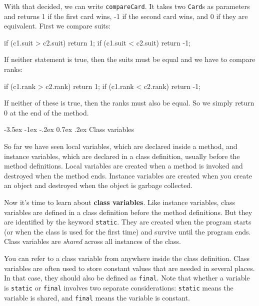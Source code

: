 \documentclass[12pt]{book}
\makeatletter
\theoremstyle{exercise}
\newcommand{\java}[1]{\verb"#1"}
\renewcommand{\section}{\@startsection{section}{1}{\z@}%
    {-3.5ex \@plus -1ex \@minus -.2ex}%
    {0.7ex \@plus.2ex}%
    {\normalfont\Large\bfseries}}
\newcommand{\java}[1]{\lstinline{#1}} %
\makeatother
\begin{document}
With that decided, we can write \java{compareCard}.
It takes two \java{Card}s as parameters and returns 1 if the first card wins, -1 if the second card wins, and 0 if they are equivalent.
First we compare suits:

\begin{code}
    if (c1.suit > c2.suit) {
        return 1;
    }
    if (c1.suit < c2.suit) {
        return -1;
    }
\end{code}

If neither statement is true, then the suits must be equal and we have to compare ranks:

\begin{code}
    if (c1.rank > c2.rank) {
        return 1;
    }
    if (c1.rank < c2.rank) {
        return -1;
    }
\end{code}

If neither of these is true, then the ranks must also be equal.
So we simply return 0 at the end of the method.


\section{Class variables}
\label{classvar}

So far we have seen local variables, which are declared inside a method, and instance variables, which are declared in a class definition, usually before the method definitions.
Local variables are created when a method is invoked and destroyed when the method ends.
Instance variables are created when you create an object and destroyed when the object is garbage collected.


Now it's time to learn about {\bf class variables}.
Like instance variables, class variables are defined in a class definition before the method definitions.
But they are identified by the keyword \java{static}.
They are created when the program starts (or when the class is used for the first time) and survive until the program ends.
Class variables are {\em shared} across all instances of the class.

You can refer to a class variable from anywhere inside the class definition.
Class variables are often used to store constant values that are needed in several places.
In that case, they should also be defined as \java{final}.
Note that whether a variable is \java{static} or \java{final} involves two separate considerations:
\java{static} means the variable is shared, and \java{final} means the variable is constant.
\end{document}
